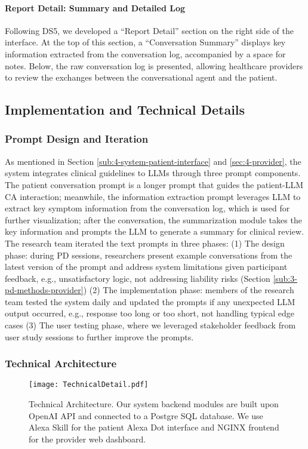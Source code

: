 \paragraph{\textbf{Report Detail: Summary and Detailed Log}}

Following DS5, we developed a ``Report Detail'' section on the right side of the interface. At the top of this section, a ``Conversation Summary'' displays key information extracted from the conversation log, accompanied by a space for notes. 
Below, the raw conversation log is presented, allowing healthcare providers to review the exchanges between the conversational agent and the patient. 


\subsection{Implementation and Technical Details}
\label{subsub:4-implemenation}
\subsubsection{Prompt Design and Iteration}
As mentioned in Section \ref{sub:4-system-patient-interface} and \ref{sec:4-provider}, the \projectname system integrates clinical guidelines to LLMs through three prompt components. The patient conversation prompt is a longer prompt that guides the patient-LLM CA interaction; meanwhile, the information extraction prompt leverages LLM to extract key symptom information from the conversation log, which is used for further visualization; after the conversation, the summarization module takes the key information and prompts the LLM to generate a summary for clinical review. The research team iterated the text prompts in three phases: 
(1) The design phase: during PD sessions, researchers present example conversations from the latest version of the prompt and address system limitations given participant feedback, e.g., unsatisfactory logic, not addressing liability risks (Section \ref{sub:3-pd-methods-provider}) 
(2) The implementation phase: members of the research team tested the \projectname system daily and updated the prompts if any unexpected LLM output occurred, e.g., response too long or too short, not handling typical edge cases
(3) The user testing phase, where we leveraged stakeholder feedback from user study sessions to further improve the prompts.
\subsubsection{Technical Architecture}
\begin{figure}[t]
    \centering
    \texttt{[image: TechnicalDetail.pdf]}
    \captionsetup{justification=centerlast}
    \caption{Technical Architecture. Our system backend modules are built upon OpenAI API and connected to a Postgre SQL database. We use Alexa Skill for the patient Alexa Dot interface and NGINX frontend for the provider web dashboard.}
    \label{fig:system-architecture}
\end{figure}

